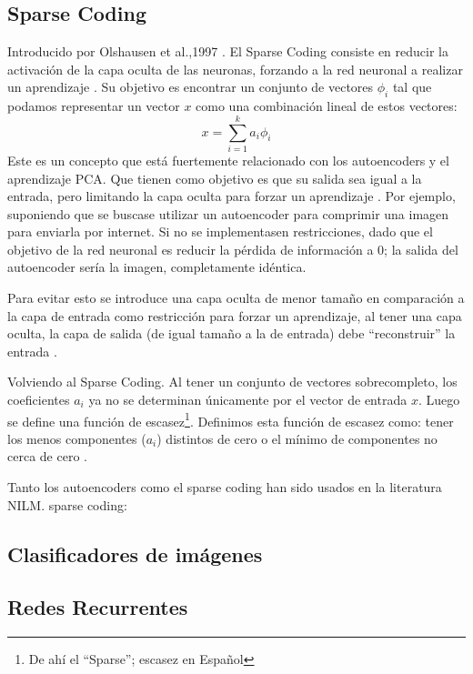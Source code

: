\subsection{Sparse Coding}
Introducido por Olshausen et al.,1997 \autocite{OLSHAUSEN}. El Sparse Coding consiste en reducir la activación de la capa oculta de las neuronas, forzando a la red neuronal a realizar un aprendizaje \autocite{stanfordSparse}.
Su objetivo es encontrar un conjunto de vectores $\phi_i$ tal que podamos representar un vector $x$ como una combinación lineal de estos vectores: 
$$
x = \sum_{i=1}^{k}a_i\phi_i
$$
Este es un concepto que está fuertemente relacionado con los autoencoders y el aprendizaje PCA. Que tienen como objetivo es que su salida sea igual a la entrada, pero limitando la capa oculta para forzar un aprendizaje \autocite{stanfordAutoEncoding}.
Por ejemplo, suponiendo que se buscase utilizar un autoencoder para comprimir una imagen para enviarla por internet. Si no se implementasen restricciones, dado que el objetivo de la red neuronal es reducir la pérdida de información a 0; la salida del autoencoder sería la imagen, completamente idéntica.

Para evitar esto se introduce una capa oculta de menor tamaño en comparación a la capa de entrada como restricción para forzar un aprendizaje, al tener una capa oculta, la capa de salida (de igual tamaño a la de entrada) debe \enquote{reconstruir} la entrada \autocite{stanfordAutoEncoding} .

Volviendo al Sparse Coding. Al tener un conjunto de vectores sobrecompleto, los coeficientes $a_i$ ya no se determinan únicamente por el vector de entrada $x$. Luego se define una función de escasez\footnote{De ahí el \enquote{Sparse}; escasez en Español}. Definimos esta función de escasez como: tener los menos componentes ($a_i$) distintos de cero o el mínimo de componentes no cerca de cero \autocite{stanfordSparse}.

Tanto los autoencoders como el sparse coding han sido usados en la literatura NILM.
sparse coding:\autocite{SparseCodingNILM}

\subsection{Clasificadores de imágenes}

\subsection{Redes Recurrentes}
\autocite{NilmTrends}

